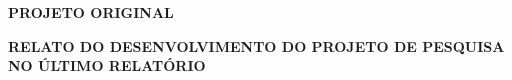\documentclass[12pt,a4paper,final]{report}%
\begin{document}
\pagebreak%



\begin{center}
\textbf{PROJETO ORIGINAL}
\end{center}


\pagebreak%



\begin{center}
\textbf{RELATO DO DESENVOLVIMENTO DO PROJETO DE PESQUISA NO ÚLTIMO RELATÓRIO }
\end{center}






\pagebreak%

																
\end{document}

